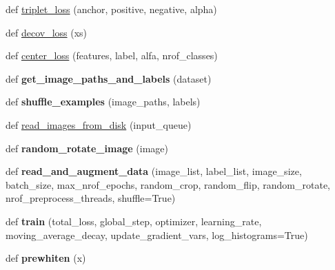 \begin{DoxyCompactItemize}
\item 
def \hyperlink{namespacefacenet_a8687a4b833d739733305b1df325fb888}{triplet\+\_\+loss} (anchor, positive, negative, alpha)
\item 
def \hyperlink{namespacefacenet_ab63b951bab1032f33280607a4d099c2c}{decov\+\_\+loss} (xs)
\item 
def \hyperlink{namespacefacenet_ac610e0e8e066018e8abb4229542cfca3}{center\+\_\+loss} (features, label, alfa, nrof\+\_\+classes)
\item 
def {\bfseries get\+\_\+image\+\_\+paths\+\_\+and\+\_\+labels} (dataset)\hypertarget{namespacefacenet_a722a386f9002e327c8bed3ac2cbf0e83}{}\label{namespacefacenet_a722a386f9002e327c8bed3ac2cbf0e83}

\item 
def {\bfseries shuffle\+\_\+examples} (image\+\_\+paths, labels)\hypertarget{namespacefacenet_adad57c35372b07640d9b728e7586d273}{}\label{namespacefacenet_adad57c35372b07640d9b728e7586d273}

\item 
def \hyperlink{namespacefacenet_ab468887342368153445c951db5cebb69}{read\+\_\+images\+\_\+from\+\_\+disk} (input\+\_\+queue)
\item 
def {\bfseries random\+\_\+rotate\+\_\+image} (image)\hypertarget{namespacefacenet_ab44fa62068a1e719d931091e5f616c17}{}\label{namespacefacenet_ab44fa62068a1e719d931091e5f616c17}

\item 
def {\bfseries read\+\_\+and\+\_\+augment\+\_\+data} (image\+\_\+list, label\+\_\+list, image\+\_\+size, batch\+\_\+size, max\+\_\+nrof\+\_\+epochs, random\+\_\+crop, random\+\_\+flip, random\+\_\+rotate, nrof\+\_\+preprocess\+\_\+threads, shuffle=True)\hypertarget{namespacefacenet_a3cffda165223d8823bc4c2854b715b96}{}\label{namespacefacenet_a3cffda165223d8823bc4c2854b715b96}

\item 
def {\bfseries train} (total\+\_\+loss, global\+\_\+step, optimizer, learning\+\_\+rate, moving\+\_\+average\+\_\+decay, update\+\_\+gradient\+\_\+vars, log\+\_\+histograms=True)\hypertarget{namespacefacenet_acd1a15c58c23e784fb0fe17dfb63a3e7}{}\label{namespacefacenet_acd1a15c58c23e784fb0fe17dfb63a3e7}

\item 
def {\bfseries prewhiten} (x)\hypertarget{namespacefacenet_ae59f1f702cf24ee44e1cbc87c040ba9f}{}\label{namespacefacenet_ae59f1f702cf24ee44e1cbc87c040ba9f}


\end{DoxyCompactItemize}
